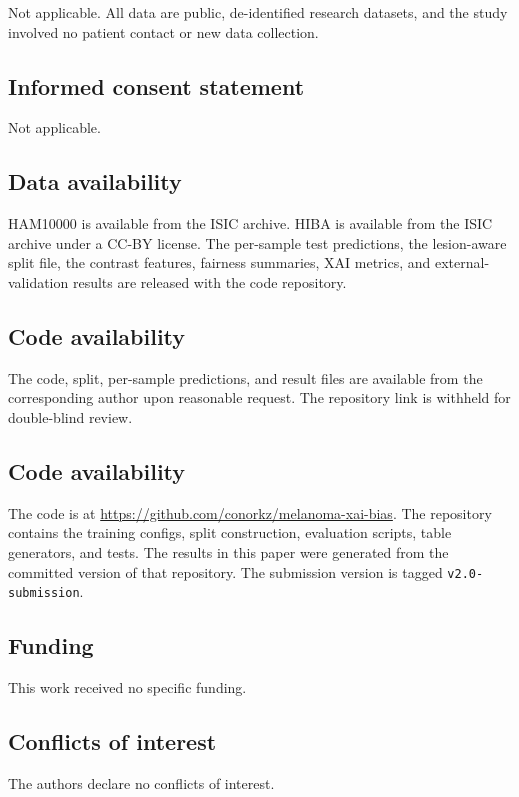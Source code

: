 Not applicable. All data are public, de-identified research datasets, and the study involved no patient contact or new data collection.

\subsection*{Informed consent statement}

Not applicable.

\subsection*{Data availability}

HAM10000 is available from the ISIC archive. HIBA is available from the ISIC archive under a CC-BY license. The per-sample test predictions, the lesion-aware split file, the contrast features, fairness summaries, XAI metrics, and external-validation results are released with the code repository.

\ifdefined\blindmode
\subsection*{Code availability}

The code, split, per-sample predictions, and result files are available from the corresponding author upon reasonable request. The repository link is withheld for double-blind review.
\else
\subsection*{Code availability}

The code is at \url{https://github.com/conorkz/melanoma-xai-bias}. The repository contains the training configs, split construction, evaluation scripts, table generators, and tests. The results in this paper were generated from the committed version of that repository. The submission version is tagged \texttt{v2.0-submission}.
\fi

\subsection*{Funding}

This work received no specific funding.

\subsection*{Conflicts of interest}

The authors declare no conflicts of interest.
